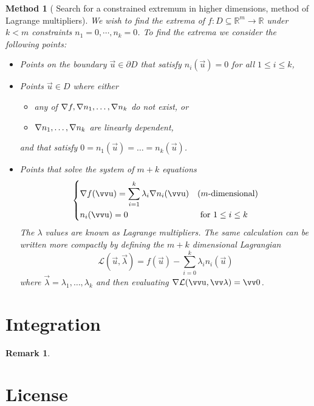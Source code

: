 \documentclass[twocolumn, margin=normal]{tex/hsrzf}
\theoremstyle{fuvarzf}
\newtheorem{method}{Method}
\newtheorem{remark}{Remark}
\begin{document}
\begin{method}[%
    Search for a constrained extremum in higher dimensions,
    method of Lagrange multipliers]
  We wish to find the extrema of \(f: D \subseteq \mathbb{R}^m \to \mathbb{R}\)
  under \(k < m\) constraints \(n_1 = 0, \cdots, n_k = 0\). To find the extrema 
  we consider the following points:
  \begin{itemize}
    \item Points on the boundary \(\vec{u} \in \partial D\) that satisfy
      \(n_i(\vec{u}) = 0\) for all \(1 \leq i \leq k\), 

    \item Points \(\vec{u} \in D\) where either
      \begin{itemize}
        \item any of \(\nabla f, \nabla n_1, \ldots, \nabla n_k\) do not exist, or
        \item \(\nabla n_1, \ldots, \nabla n_k\) are linearly \emph{dependent},
      \end{itemize}
      and that satisfy \(0 = n_1(\vec{u}) = \ldots = n_k(\vec{u})\).

    \item Points that solve the system of \(m+k\) equations
      \[
        \begin{dcases}
          \grad f(\vec{u}) = \sum_{i = 1}^k \lambda_i \grad n_i(\vec{u})
            & (m\text{-dimensional}) \\
          n_i(\vec{u}) = 0  & \text{ for } 1 \leq i \leq k
        \end{dcases}
      \]
      The \(\lambda\) values are known as \emph{Lagrange multipliers}. The same
      calculation can be written more compactly by defining the
      \(m+k\) dimensional \emph{Lagrangian}
      \[
        \mathcal{L}(\vec{u}, \vec{\lambda}) 
          = f(\vec{u}) - \sum_{i = 0}^k \lambda_i n_i(\vec{u})
      \]
      where \(\vec{\lambda} = \lambda_1, \ldots, \lambda_k\) and then
      evaluating \(\grad \mathcal{L}(\vec{u}, \vec{\lambda}) = \vec{0}\).
  \end{itemize}
\end{method}

\section{Integration}
\begin{remark}
  
\end{remark}


\section*{License}
\doclicenseText

\begin{center}
  \doclicenseImage
\end{center}
\end{document}
